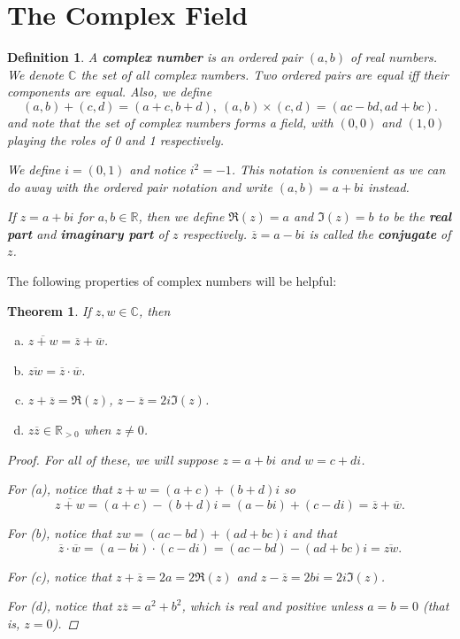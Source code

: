 \documentclass{scrbook}
\newcommand{\R}{\mathbb{R}}
\newcommand{\C}{\mathbb{C}}
\renewcommand{\bar}{\overline}
\newtheorem{theorem}{Theorem}
\newtheorem{definition}{Definition}
\begin{document}
\section{The Complex Field}
\begin{definition}
A \textbf{complex number} is an ordered pair $(a, b)$ of real numbers. We denote $\C$ the set of all complex numbers. Two ordered pairs are equal iff their components are equal. Also, we define
\[
	(a, b) + (c, d) = (a + c, b + d),\ (a, b) \times (c, d) = (ac - bd, ad + bc).
\]
and note that the set of complex numbers forms a field, with $(0, 0)$ and $(1, 0)$ playing the roles of 0 and 1 respectively.

We define $i = (0, 1)$ and notice $i^2 = -1$. This notation is convenient as we can do away with the ordered pair notation and write $(a, b) = a + bi$ instead.

If $z = a + bi$ for $a, b \in \R$, then we define $\Re(z) = a$ and $\Im(z) = b$ to be the \textbf{real part} and \textbf{imaginary part} of $z$ respectively. $\bar{z} = a - bi$ is called the \textbf{conjugate} of $z$. 
\end{definition}

The following properties of complex numbers will be helpful:
\begin{theorem}
If $z, w \in \C$, then 
\begin{enumerate}[(a)]
\item $\bar{z + w} = \bar{z} + \bar{w}$.
\item $\bar{zw} = \bar{z} \cdot \bar{w}$.
\item $z + \bar{z} = \Re(z)$, $z - \bar{z} = 2i\Im(z)$.
\item $z\bar{z} \in \R_{>0}$ when $z \ne 0$.
\end{enumerate}
\begin{proof}
For all of these, we will suppose $z = a + bi$ and $w = c + di$.

For (a), notice that $z + w = (a + c) + (b + d)i$ so
\[
	\bar{z + w} = (a + c) - (b + d)i = (a - bi) + (c - di) = \bar{z} + \bar{w}.
\]

For (b), notice that $zw = (ac - bd) + (ad + bc)i$ and that
\[
	\bar{z} \cdot \bar{w} = (a - bi) \cdot (c - di) = (ac - bd) - (ad + bc)i = \bar{zw}.
\]

For (c), notice that $z + \bar{z} = 2a = 2\Re(z)$ and $z - \bar{z} = 2bi = 2i\Im(z)$.

For (d), notice that $z\bar{z} = a^2 + b^2$, which is real and positive unless $a = b = 0$ (that is, $z = 0$).
\end{proof}
\end{theorem}
\end{document}
